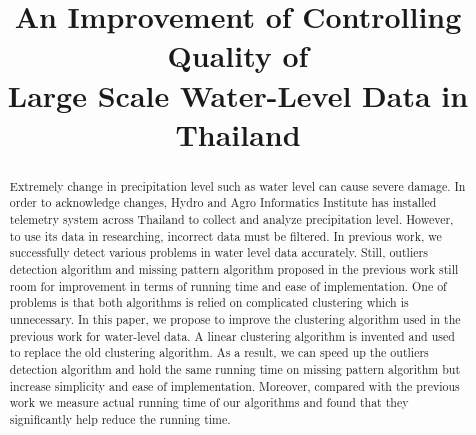 \documentclass[conference]{IEEEtran}
\begin{document}
\title{An Improvement of Controlling Quality of \\Large Scale Water-Level Data in Thailand}

\author{
\and
{}
}

\maketitle


\begin{abstract}
Extremely change in precipitation level such as water level can cause severe damage. In order to acknowledge changes, Hydro and Agro Informatics Institute has installed telemetry system across Thailand to collect and analyze precipitation level. However, to use its data in researching, incorrect data must be filtered. In previous work, we successfully detect various problems in water level data accurately. Still, outliers detection algorithm  and missing pattern algorithm proposed in the previous work still room for improvement in terms of running time and ease of implementation. One of problems is that both algorithms is relied on complicated clustering which is unnecessary. In this paper, we propose to improve the clustering algorithm used in the previous work for water-level data. A linear clustering algorithm is invented and used to replace the old clustering algorithm. As a result, we can speed up the outliers detection algorithm and hold the same running time on missing pattern algorithm but increase simplicity and ease of implementation. Moreover, compared with the previous work we measure actual running time of our algorithms and found that they significantly help reduce the running time.

\end{abstract}
\end{document}
